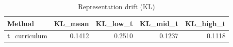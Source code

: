 \begin{table}[htbp]
\centering
\caption{Representation drift (KL)}
\label{tab:repr-drift}
\begin{tabular}{lrrrr}
\toprule
\textbf{Method} & \textbf{KL\_mean} & \textbf{KL\_low\_t} & \textbf{KL\_mid\_t} & \textbf{KL\_high\_t} \\
\midrule
t\_curriculum & 0.1412 & 0.2510 & 0.1237 & 0.1118 \\
\bottomrule
\end{tabular}
\end{table}